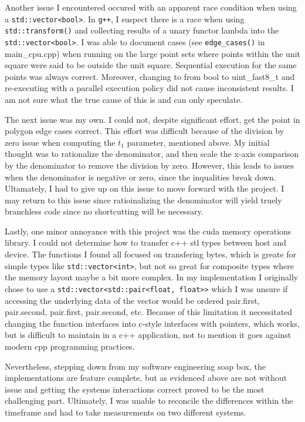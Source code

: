 \documentclass{article}
\begin{document}
Another issue I encountered occured with an apparent race condition when using a \texttt{std::vector<bool>}. In \texttt{g++}, I suspect there is a race when using \texttt{std::transform()} and collecting results of a unary functor lambda into the \texttt{std::vector<bool>}. I was able to document cases (see \texttt{edge\_cases()} in main\_cpu.cpp) when running on the large point sets where points within the unit square were said to be outside the unit square. Sequential execution for the same points was always correct. Moreover, changing to from bool to uint\_fast8\_t and re-executing with a parallel execution policy did not cause inconsistent results. I am not sure what the true cause of this is and can only speculate.  

The next issue was my own. I could not, despite significant effort, get the point in polygon edge cases correct. This effort was difficult because  of the division by zero issue when computing the $t_1$ parameter, mentioned above. My initial thought was to rationalize the denominator, and then scale the x-axis comparison by the denominator to remove the division by zero. However, this leads to issues when the denominator is negative or zero, since the inqualities break down. Ultamately, I had to give up on this issue to move forward with the project. I may return to this issue since ratioinalizing the denominator will yield truely branchless code since no shortcutting will be necessary.

Lastly, one minor annoyance with this project was the cuda memory operations library. I could not determine how to transfer c++ stl types between host and device. The functions I found all focused on transfering bytes, which is greate for simple types like \texttt{std::vector<int>}, but not so great for composite types where the memory layout maybe a bit more complex. In my implementation I originally chose to use a \texttt{std::vector<std::pair<float, float>>} which I was unsure if accessing the underlying data of the vector would be ordered pair.first, pair.second, pair.first, pair.second, etc. Because of this limitation it necessitated changing the function interfaces into c-style interfaces with pointers, which works, but is difficult to maintain in a c++ application, not to mention it goes against modern cpp programming practices.

Nevertheless, stepping down from my software engineering soap box, the implementations are feature complete, but as evidenced above are not without issue and getting the systems interactions correct proved to be the most challenging part. Ultimately, I was unable to reconcile the differences within the timeframe and had to take measurements on two different systems.
 
\end{document}
